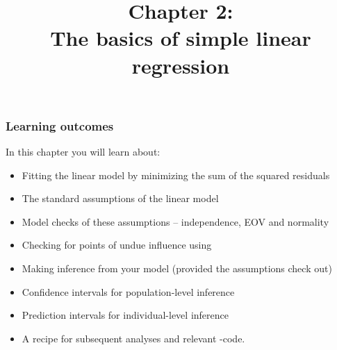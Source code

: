 \documentclass{beamer}\usepackage[]{graphicx}\usepackage[]{xcolor}
\begin{document}
\newcommand{\thechapter}{2}


\title{Chapter 2: \\ The basics of simple linear regression}

\begin{frame}
\titlepage
\end{frame}

\begin{frame}[t]
\frametitle{Learning outcomes}
In this chapter you will learn about:
\begin{center}
\vspace{6pt}
\begin{minipage}{0.9\textwidth}
  \begin{itemize}
  \item Fitting the linear model by minimizing the sum of the squared residuals
  \item The standard assumptions of the linear model
  \item Model checks of these assumptions  --  independence, EOV and normality
  \item Checking for points of undue influence using 
  \item Making inference from your model (provided the assumptions check out)
  \item Confidence intervals for population-level inference
  \item Prediction intervals for individual-level inference
  \item A recipe for subsequent analyses and relevant -code.
  \end{itemize}
\end{minipage}
\end{center}
\end{frame}




\end{document}
